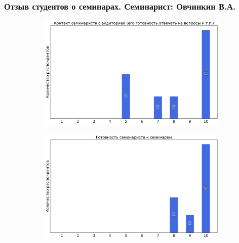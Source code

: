         \subsubsection{Отзыв студентов о семинарах. Семинарист: Овчинкин В.А.}
            \begin{figure}[H]
                \centering
                \begin{subfigure}[b]{0.45\textwidth}
                    \centering
                    \includegraphics[width=\textwidth]{images/3 course/Общая физика - квантовая физика/seminarists-marks-Овчинкин В.А.-0.png}
                \end{subfigure}
                \begin{subfigure}[b]{0.45\textwidth}
                    \centering
                    \includegraphics[width=\textwidth]{images/3 course/Общая физика - квантовая физика/seminarists-marks-Овчинкин В.А.-1.png}
                \end{subfigure}
                \begin{subfigure}[b]{0.45\textwidth}

\end{subfigure}
\end{figure}
